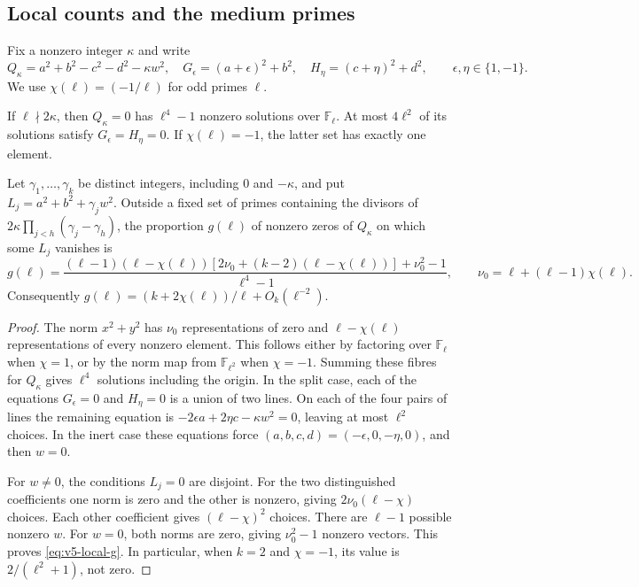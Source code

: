 \subsection{Local counts and the medium primes}\label{subsec:v5-local-sieve}

Fix a nonzero integer $\kappa$ and write
\[
 Q_\kappa=a^2+b^2-c^2-d^2-\kappa w^2,\quad
 G_\epsilon=(a+\epsilon)^2+b^2,\quad
 H_\eta=(c+\eta)^2+d^2,
 \qquad \epsilon,\eta\in\{1,-1\}.
\]
We use $\chi(\ell)=(-1/\ell)$ for odd primes $\ell$.

\begin{lemma}\label{lem:v5-local-counts}
If $\ell\nmid2\kappa$, then $Q_\kappa=0$ has $\ell^4-1$ nonzero
solutions over $\mathbb F_\ell$. At most $4\ell^2$ of its solutions satisfy
$G_\epsilon=H_\eta=0$. If $\chi(\ell)=-1$, the latter set has exactly one
element.

Let $\gamma_1,\ldots,\gamma_k$ be distinct integers, including $0$ and
$-\kappa$, and put $L_j=a^2+b^2+\gamma_jw^2$. Outside a fixed set of primes
containing the divisors of $2\kappa\prod_{j<h}(\gamma_j-\gamma_h)$, the
proportion $g(\ell)$ of nonzero zeros of $Q_\kappa$ on which some $L_j$
vanishes is
\begin{equation}\label{eq:v5-local-g}
 g(\ell)=
 \frac{(\ell-1)(\ell-\chi(\ell))
 [2\nu_0+(k-2)(\ell-\chi(\ell))]+\nu_0^2-1}{\ell^4-1},
 \qquad \nu_0=\ell+(\ell-1)\chi(\ell).
\end{equation}
Consequently $g(\ell)=(k+2\chi(\ell))/\ell+O_k(\ell^{-2})$.
\end{lemma}
\begin{proof}
The norm $x^2+y^2$ has $\nu_0$ representations of zero and
$\ell-\chi(\ell)$ representations of every nonzero element. This follows
either by factoring over $\mathbb F_\ell$ when $\chi=1$, or by the norm map
from $\mathbb F_{\ell^2}$ when $\chi=-1$. Summing these fibres for
$Q_\kappa$ gives $\ell^4$ solutions including the origin.
In the split case, each of the equations $G_\epsilon=0$ and $H_\eta=0$
is a union of two lines. On each of the four pairs of lines the remaining
equation is
$-2\epsilon a+2\eta c-\kappa w^2=0$, leaving at most $\ell^2$ choices.
In the inert case these equations force
$(a,b,c,d)=(-\epsilon,0,-\eta,0)$, and then $w=0$.

For $w\ne0$, the conditions $L_j=0$ are disjoint. For the two distinguished
coefficients one norm is zero and the other is nonzero, giving
$2\nu_0(\ell-\chi)$ choices. Each other coefficient gives
$(\ell-\chi)^2$ choices. There are $\ell-1$ possible nonzero $w$.
For $w=0$, both norms are zero, giving $\nu_0^2-1$ nonzero vectors.
This proves \eqref{eq:v5-local-g}. In particular, when $k=2$ and
$\chi=-1$, its value is $2/(\ell^2+1)$, not zero.
\end{proof}

